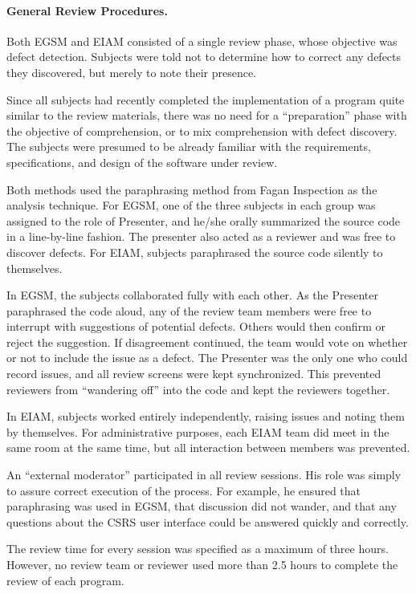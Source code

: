 \paragraph{General Review Procedures.}

Both EGSM and EIAM consisted of a single review phase, whose objective was
defect detection.  Subjects were told not to determine how to correct any
defects they discovered, but merely to note their presence.  

Since all subjects had recently completed the implementation of a program
quite similar to the review materials, there was no need for a
``preparation'' phase with the objective of comprehension, or to mix
comprehension with defect discovery. The subjects were presumed to be 
already familiar with the requirements, specifications, and design of the 
software under review.

Both methods used the paraphrasing method from Fagan Inspection as the
analysis technique.  For EGSM, one of the three subjects in each group was
assigned to the role of Presenter, and he/she orally summarized the
source code in a line-by-line fashion.  The presenter also acted as a
reviewer and was free to discover defects. For EIAM, subjects paraphrased the
source code silently to themselves.

In EGSM, the subjects collaborated fully with each other. As the Presenter
paraphrased the code aloud, any of the review team members were free to interrupt
with suggestions of potential defects. Others would then confirm or reject
the suggestion.  If disagreement continued, the team would vote on whether
or not to include the issue as a defect.  The Presenter was the only one
who could record issues, and all review screens were kept synchronized. This
prevented reviewers from ``wandering off'' into the code and kept the
reviewers together.

In EIAM, subjects worked entirely independently, raising issues and noting
them by themselves. For administrative purposes, each EIAM team did meet in
the same room at the same time, but all interaction between members was
prevented.

An ``external moderator'' participated in all review sessions. 
His role was simply to assure correct execution of the process. 
For example, he ensured that paraphrasing was used in EGSM, that 
discussion did not wander, and that any questions about the CSRS 
user interface could be answered quickly and correctly. 

The review time for every session was specified as a maximum of three hours. 
However, no review team or reviewer used more than 2.5 hours to complete
the review of each program. 

